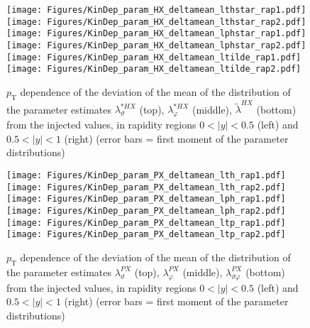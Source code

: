 \documentclass[12pt]{article}
\newcommand{\pT}{p_\mathrm{T}}
\newcommand{\absy}{\left |  y \right |}
\newcommand{\lamtildeHX}{\tilde{\lambda}^{\scriptscriptstyle HX}}
\newcommand{\lamthstarHX}{\lambda^{* \scriptscriptstyle HX}_\vartheta}
\newcommand{\lamphstarHX}{\lambda^{* \scriptscriptstyle HX}_\varphi}
\newcommand{\lamthPX}{\lambda^{\scriptscriptstyle PX}_\vartheta}
\newcommand{\lamphPX}{\lambda^{\scriptscriptstyle PX}_\varphi}
\newcommand{\lamthphPX}{\lambda^{\scriptscriptstyle PX}_{\vartheta \varphi}}
\begin{document}
\begin{figure}[htbp]
\centering
\texttt{[image: Figures/KinDep\_param\_HX\_deltamean\_lthstar\_rap1.pdf]}
\texttt{[image: Figures/KinDep\_param\_HX\_deltamean\_lthstar\_rap2.pdf]}
\texttt{[image: Figures/KinDep\_param\_HX\_deltamean\_lphstar\_rap1.pdf]}
\texttt{[image: Figures/KinDep\_param\_HX\_deltamean\_lphstar\_rap2.pdf]}
\texttt{[image: Figures/KinDep\_param\_HX\_deltamean\_ltilde\_rap1.pdf]}
\texttt{[image: Figures/KinDep\_param\_HX\_deltamean\_ltilde\_rap2.pdf]}
\caption{$\pT$ dependence of the deviation of the mean of the distribution of
the parameter estimates $\lamthstarHX$ (top), $\lamphstarHX$ (middle),
$\lamtildeHX$ (bottom) from the injected values, in rapidity regions
$0<\absy<0.5$ (left) and $0.5<\absy<1$ (right) (error bars = first moment of
the parameter distributions)}
\end{figure}
\clearpage











\begin{figure}[htbp]
\centering
\texttt{[image: Figures/KinDep\_param\_PX\_deltamean\_lth\_rap1.pdf]}
\texttt{[image: Figures/KinDep\_param\_PX\_deltamean\_lth\_rap2.pdf]}
\texttt{[image: Figures/KinDep\_param\_PX\_deltamean\_lph\_rap1.pdf]}
\texttt{[image: Figures/KinDep\_param\_PX\_deltamean\_lph\_rap2.pdf]}
\texttt{[image: Figures/KinDep\_param\_PX\_deltamean\_ltp\_rap1.pdf]}
\texttt{[image: Figures/KinDep\_param\_PX\_deltamean\_ltp\_rap2.pdf]}
\caption{$\pT$ dependence of the deviation of the mean of the distribution of
the parameter estimates $\lamthPX$ (top), $\lamphPX$ (middle), $\lamthphPX$
(bottom) from the injected values, in rapidity regions $0<\absy<0.5$ (left) and
$0.5<\absy<1$ (right) (error bars = first moment of the parameter
distributions)}
\end{figure}
\clearpage
\end{document}
